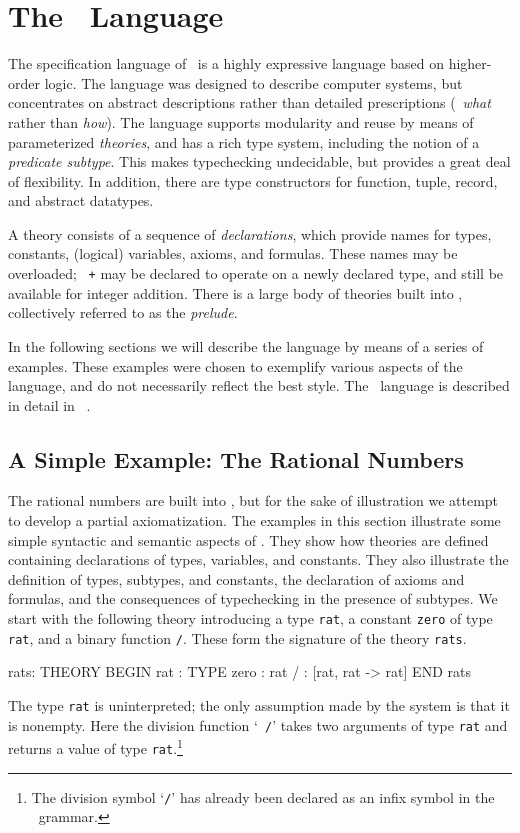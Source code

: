 
\def\stt{\smaller\tt}

\section{The \pvs\ Language}

The specification language of \pvs\ is a highly expressive language
based on higher-order logic.  The language was designed to describe
computer systems, but concentrates on abstract descriptions rather than
detailed prescriptions (\ie\ {\em what\/} rather than {\em how\/}).  The
language supports modularity and reuse by means of parameterized {\em
theories\/}, and has a rich type system, including the notion of a
{\em predicate subtype\/}.  This makes typechecking undecidable, but
provides a great deal of flexibility.  In addition, there are type
constructors for function, tuple, record, and abstract datatypes.

A theory consists of a sequence of {\em declarations\/}, which provide
names for types, constants, (logical) variables, axioms, and formulas.
These names may be overloaded; \eg\ {\tt +} may be declared to operate
on a newly declared type, and still be available for integer addition.
There is a large body of theories built into \pvs, collectively
referred to as the {\em prelude\/}.

In the following sections we will describe the language by means of a
series of examples.  These examples were chosen to exemplify various
aspects of the language, and do not necessarily reflect the best style.
The \pvs\ language is described in detail in ~\cite{PVS:language}.


\subsection{A Simple Example: The Rational Numbers}

The rational numbers are built into \pvs, but for the sake of
illustration we attempt to develop a partial axiomatization.  The
examples in this section illustrate some simple syntactic and semantic
aspects of \pvs\@.  They show how theories are defined containing
declarations of types, variables, and constants.  They also illustrate
the definition of types, subtypes, and constants, the declaration of
axioms and formulas, and the consequences of typechecking in the
presence of subtypes.  We start with the following theory introducing a
type {\stt rat}, a constant {\stt zero} of type {\stt rat}, and a binary
function {\tt /}.  These form the signature of the theory {\stt rats}.
\begin{pvsex}
  rats: THEORY
   BEGIN
    rat : TYPE
    zero : rat
    / : [rat, rat -> rat]
   END rats
\end{pvsex}
%
The type {\stt rat} is uninterpreted; the only assumption made by the
system is that it is nonempty.  Here the division function `{\tt
/}' takes two arguments of type {\stt rat} and returns a value of type
{\stt rat}.\footnote{The division symbol `{\tt /}' has already been
declared as an infix symbol in the \pvs\ grammar.}

